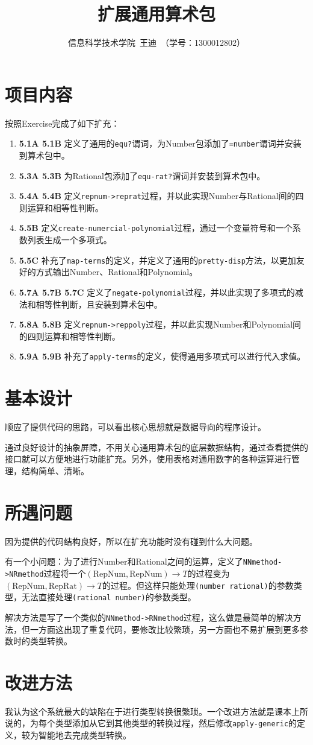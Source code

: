 \documentclass[a4paper]{article}
\author{{信息科学技术学院~王迪~（学号：1300012802）}}
\newcommand{\Code}[1]{\mbox{\tt #1}}
\begin{document}
\title{扩展通用算术包}
\maketitle

\section{项目内容}
按照Exercise完成了如下扩充：
\begin{enumerate}
    \item \textbf{5.1A 5.1B} 定义了通用的\Code{equ?}谓词，为Number包添加了\Code{=number}谓词并安装到算术包中。
    \item \textbf{5.3A 5.3B} 为Rational包添加了\Code{equ-rat?}谓词并安装到算术包中。
    \item \textbf{5.4A 5.4B} 定义\Code{repnum->reprat}过程，并以此实现Number与Rational间的四则运算和相等性判断。
    \item \textbf{5.5B} 定义\Code{create-numercial-polynomial}过程，通过一个变量符号和一个系数列表生成一个多项式。
    \item \textbf{5.5C} 补充了\Code{map-terms}的定义，并定义了通用的\Code{pretty-disp}方法，以更加友好的方式输出Number、Rational和Polynomial。
    \item \textbf{5.7A 5.7B 5.7C} 定义了\Code{negate-polynomial}过程，并以此实现了多项式的减法和相等性判断，且安装到算术包中。
    \item \textbf{5.8A 5.8B} 定义\Code{repnum->reppoly}过程，并以此实现Number和Polynomial间的四则运算和相等性判断。
    \item \textbf{5.9A 5.9B} 补充了\Code{apply-terms}的定义，使得通用多项式可以进行代入求值。
\end{enumerate}

\section{基本设计}
顺应了提供代码的思路，可以看出核心思想就是数据导向的程序设计。

通过良好设计的抽象屏障，不用关心通用算术包的底层数据结构，通过查看提供的接口就可以方便地进行功能扩充。另外，使用表格对通用数字的各种运算进行管理，结构简单、清晰。

\section{所遇问题}
因为提供的代码结构良好，所以在扩充功能时没有碰到什么大问题。

有一个小问题：为了进行Number和Rational之间的运算，定义了\Code{NNmethod->NRmethod}过程将一个$(\mbox{RepNum},\mbox{RepNum}) \to T$的过程变为$(\mbox{RepNum},\mbox{RepRat}) \to T$的过程。但这样只能处理\Code{(number rational)}的参数类型，无法直接处理\Code{(rational number)}的参数类型。

解决方法是写了一个类似的\Code{NNmethod->RNmethod}过程，这么做是最简单的解决方法，但一方面这出现了重复代码，要修改比较繁琐，另一方面也不易扩展到更多参数时的类型转换。

\section{改进方法}
我认为这个系统最大的缺陷在于进行类型转换很繁琐。一个改进方法就是课本上所说的，为每个类型添加从它到其他类型的转换过程，然后修改\Code{apply-generic}的定义，较为智能地去完成类型转换。
\end{document}
